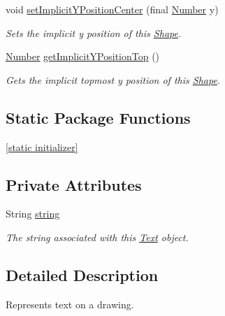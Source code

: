 \begin{DoxyCompactItemize}
void \hyperlink{classcom_1_1aarrelaakso_1_1drawl_1_1_shape_a79c79420c626b8b2d2534b6c9aa64d8f}{set\+Implicit\+Y\+Position\+Center} (final \hyperlink{interfacecom_1_1aarrelaakso_1_1drawl_1_1_number}{Number} y)
\begin{DoxyCompactList}\small\item\em Sets the implicit y position of this \hyperlink{classcom_1_1aarrelaakso_1_1drawl_1_1_shape}{Shape}. \end{DoxyCompactList}\item 
\hyperlink{interfacecom_1_1aarrelaakso_1_1drawl_1_1_number}{Number} \hyperlink{classcom_1_1aarrelaakso_1_1drawl_1_1_shape_a6a52176302dd9b5d2bfc2d25409c310e}{get\+Implicit\+Y\+Position\+Top} ()
\begin{DoxyCompactList}\small\item\em Gets the implicit topmost y position of this \hyperlink{classcom_1_1aarrelaakso_1_1drawl_1_1_shape}{Shape}. \end{DoxyCompactList}\end{DoxyCompactItemize}
\subsection*{Static Package Functions}
\begin{DoxyCompactItemize}
\item 
\hyperlink{classcom_1_1aarrelaakso_1_1drawl_1_1_shape_ad2adcb85374cf5d6d59429628314e8d1}{\mbox{[}static initializer\mbox{]}}
\end{DoxyCompactItemize}
\subsection*{Private Attributes}
\begin{DoxyCompactItemize}
\item 
String \hyperlink{classcom_1_1aarrelaakso_1_1drawl_1_1_text_a94bf15b06c72349f5d5a1bfc56496685}{string}
\begin{DoxyCompactList}\small\item\em The string associated with this \hyperlink{classcom_1_1aarrelaakso_1_1drawl_1_1_text}{Text} object. \end{DoxyCompactList}\end{DoxyCompactItemize}


\subsection{Detailed Description}
Represents text on a drawing. 

